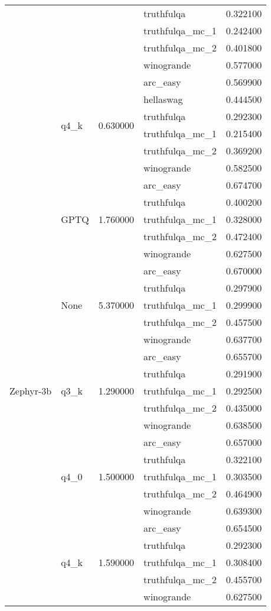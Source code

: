 \begin{tabular}{lllll}
 &  &  & truthfulqa & 0.322100 \\
 &  &  & truthfulqa\_mc\_1 & 0.242400 \\
 &  &  & truthfulqa\_mc\_2 & 0.401800 \\
 &  &  & winogrande & 0.577000 \\
\cline{2-5} \cline{3-5}
 & \multirow[t]{6}{*}{q4\_k} & \multirow[t]{6}{*}{0.630000} & arc\_easy & 0.569900 \\
 &  &  & hellaswag & 0.444500 \\
 &  &  & truthfulqa & 0.292300 \\
 &  &  & truthfulqa\_mc\_1 & 0.215400 \\
 &  &  & truthfulqa\_mc\_2 & 0.369200 \\
 &  &  & winogrande & 0.582500 \\
\cline{1-5} \cline{2-5} \cline{3-5}
\multirow[t]{25}{*}{Zephyr-3b} & \multirow[t]{5}{*}{GPTQ} & \multirow[t]{5}{*}{1.760000} & arc\_easy & 0.674700 \\
 &  &  & truthfulqa & 0.400200 \\
 &  &  & truthfulqa\_mc\_1 & 0.328000 \\
 &  &  & truthfulqa\_mc\_2 & 0.472400 \\
 &  &  & winogrande & 0.627500 \\
\cline{2-5} \cline{3-5}
 & \multirow[t]{5}{*}{None} & \multirow[t]{5}{*}{5.370000} & arc\_easy & 0.670000 \\
 &  &  & truthfulqa & 0.297900 \\
 &  &  & truthfulqa\_mc\_1 & 0.299900 \\
 &  &  & truthfulqa\_mc\_2 & 0.457500 \\
 &  &  & winogrande & 0.637700 \\
\cline{2-5} \cline{3-5}
 & \multirow[t]{5}{*}{q3\_k} & \multirow[t]{5}{*}{1.290000} & arc\_easy & 0.655700 \\
 &  &  & truthfulqa & 0.291900 \\
 &  &  & truthfulqa\_mc\_1 & 0.292500 \\
 &  &  & truthfulqa\_mc\_2 & 0.435000 \\
 &  &  & winogrande & 0.638500 \\
\cline{2-5} \cline{3-5}
 & \multirow[t]{5}{*}{q4\_0} & \multirow[t]{5}{*}{1.500000} & arc\_easy & 0.657000 \\
 &  &  & truthfulqa & 0.322100 \\
 &  &  & truthfulqa\_mc\_1 & 0.303500 \\
 &  &  & truthfulqa\_mc\_2 & 0.464900 \\
 &  &  & winogrande & 0.639300 \\
\cline{2-5} \cline{3-5}
 & \multirow[t]{5}{*}{q4\_k} & \multirow[t]{5}{*}{1.590000} & arc\_easy & 0.654500 \\
 &  &  & truthfulqa & 0.292300 \\
 &  &  & truthfulqa\_mc\_1 & 0.308400 \\
 &  &  & truthfulqa\_mc\_2 & 0.455700 \\
 &  &  & winogrande & 0.627500 \\
\cline{1-5} \cline{2-5} \cline{3-5}
\bottomrule
\end{tabular}
